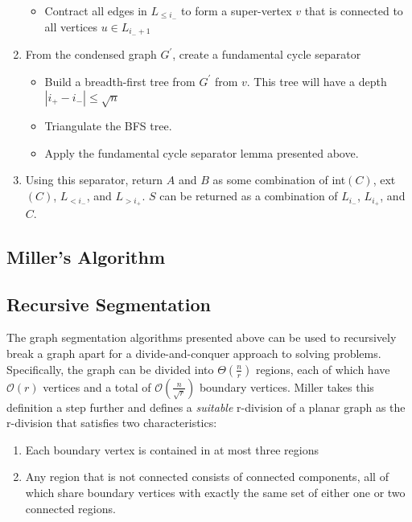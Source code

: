 \documentclass[12pt]{article}
\begin{document}
\begin{enumerate}
\begin{itemize}
            \item Contract all edges in $L_{\leq i_-}$ to form a super-vertex $v$ that is connected to all vertices $u \in L_{i_- + 1}$
        \end{itemize}

        \item From the condensed graph $G^{'}$, create a fundamental cycle separator
        \begin{itemize}
            \item Build a breadth-first tree from $G^{'}$ from $v$. This tree will have a depth $|i_+ - i_-| \leq \sqrt{n}$

            \item Triangulate the BFS tree.

            \item Apply the fundamental cycle separator lemma presented above.
        \end{itemize}

        \item Using this separator, return $A$ and $B$ as some combination of int$(C)$, ext$(C)$, $L_{< i_-}$, and $L_{> i_+}$. $S$ can be returned as a combination of $L_{i_-}$, $L_{i_+}$, and $C$.
    \end{enumerate}

    \subsection{Miller's Algorithm}
    \label{sec:graph-sep-miller}



    \subsection{Recursive Segmentation}
    \label{sec:graph-sep-recursive-seg}


    The graph segmentation algorithms presented above can be used to recursively break a graph apart for a divide-and-conquer approach to solving problems. Specifically, the graph can be divided into $\Theta \left (\frac{n}{r} \right )$ regions, each of which have $\mathcal{O}(r)$ vertices and a total of $\mathcal{O} \left (\frac{n}{\sqrt{r}} \right )$ boundary vertices. Miller takes this definition a step further and defines a \textit{suitable} r-division of a planar graph as the r-division that satisfies two characteristics:
    \begin{enumerate}
        \item Each boundary vertex is contained in at most three regions

        \item Any region that is not connected consists of connected components, all of which share boundary vertices with exactly the same set of either one or two connected regions.
    \end{enumerate}
\end{document}
